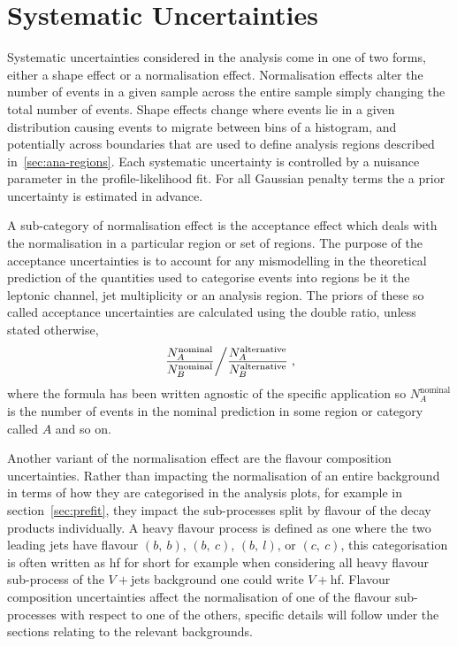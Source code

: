 \chapter{Systematic Uncertainties}%
\label{ch:systematics}

Systematic uncertainties considered in the analysis come in one of two forms,
either a shape effect or a normalisation effect. Normalisation effects alter the
number of events in a given sample across the entire sample simply changing the
total number of events. Shape effects change where events lie in a given
distribution causing events to migrate between bins of a histogram, and
potentially across boundaries that are used to define analysis regions described
in~\ref{sec:ana-regions}. Each systematic uncertainty is controlled by a
nuisance parameter in the profile-likelihood fit. For all Gaussian penalty terms
the a prior uncertainty is estimated in advance.

A sub-category of normalisation effect is the acceptance effect which deals with
the normalisation in a particular region or set of regions. The purpose of the
acceptance uncertainties is to account for any mismodelling in the theoretical
prediction of the quantities used to categorise events into regions be it the
leptonic channel, jet multiplicity or an analysis region. The priors of these so
called acceptance uncertainties are calculated using the double ratio, unless
stated otherwise,
\begin{equation}
  \left. \dfrac{N_{A}^{\text{nominal}}}{N_{B}^{\text{nominal}}} \middle/
    \dfrac{N_{A}^{\text{alternative}}}{N_{B}^{\text{alternative}}} \right.,
  \label{eq:acceptance-dr}
\end{equation}
where the formula has been written agnostic of the specific application so
$N_{A}^{\text{nominal}}$ is the number of  events in the nominal prediction in
some region or category called $A$ and so on.

Another variant of the normalisation effect are the flavour composition
uncertainties. Rather than impacting the normalisation of an entire background
in terms of how they are categorised in the analysis plots, for example in
section~\ref{sec:prefit}, they impact the sub-processes split by flavour of the
decay products individually. A heavy flavour process is defined as one where the
two leading jets have flavour $(b,~b)$, $(b,~c)$, $(b,~l)$, or $(c,~c)$,
this categorisation is often written as hf for short for example when
considering all heavy flavour sub-process of the $V+$jets background one could
write $V+$hf. Flavour composition uncertainties affect the normalisation of one
of the flavour sub-processes with respect to one of the others, specific details
will follow under the sections relating to the relevant backgrounds.

